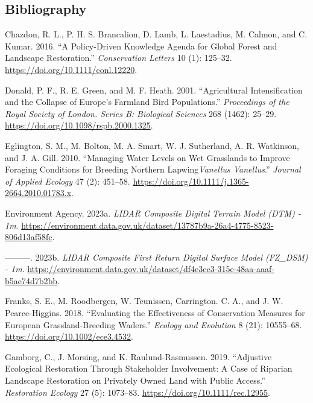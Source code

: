 \documentclass[
  12pt,
  letterpaper,
  DIV=11,
  numbers=noendperiod]{scrartcl}
\newlength{\cslhangindent}
\newenvironment{CSLReferences}[2] %
 {\begin{list}{}{%
  \setlength{\itemindent}{0pt}
  \setlength{\leftmargin}{0pt}
  \setlength{\parsep}{0pt}
  \ifodd #1
   \setlength{\leftmargin}{\cslhangindent}
   \setlength{\itemindent}{-1\cslhangindent}
  \fi
  \setlength{\itemsep}{#2\baselineskip}}}
 {\end{list}}
\begin{document}
\subsection*{Bibliography}\label{bibliography}

\label{refs}
\begin{CSLReferences}{1}{0}
Chazdon, R. L., P. H. S. Brancalion, D. Lamb, L. Laestadius, M. Calmon,
and C. Kumar. 2016. {``A Policy{-}Driven Knowledge Agenda for Global
Forest and Landscape Restoration.''} \emph{Conservation Letters} 10 (1):
125--32. \url{https://doi.org/10.1111/conl.12220}.

Donald, P. F., R. E. Green, and M. F. Heath. 2001. {``Agricultural
Intensification and the Collapse of Europe's Farmland Bird
Populations.''} \emph{Proceedings of the Royal Society of London. Series
B: Biological Sciences} 268 (1462): 25--29.
\url{https://doi.org/10.1098/rspb.2000.1325}.

Eglington, S. M., M. Bolton, M. A. Smart, W. J. Sutherland, A. R.
Watkinson, and J. A. Gill. 2010. {``Managing Water Levels on Wet
Grasslands to Improve Foraging Conditions for Breeding Northern
Lapwing{\emph{Vanellus Vanellus}}.''} \emph{Journal of Applied Ecology}
47 (2): 451--58. \url{https://doi.org/10.1111/j.1365-2664.2010.01783.x}.

Environment Agency. 2023a. \emph{LIDAR Composite Digital Terrain Model
(DTM) - 1m}.
\url{https://environment.data.gov.uk/dataset/13787b9a-26a4-4775-8523-806d13af58fc}.

---------. 2023b. \emph{LIDAR Composite First Return Digital Surface
Model (FZ\_DSM) - 1m}.
\url{https://environment.data.gov.uk/dataset/df4e3ec3-315e-48aa-aaaf-b5ae74d7b2bb}.

Franks, S. E., M. Roodbergen, W. Teunissen, Carrington. C. A., and J. W.
Pearce-Higgins. 2018. {``Evaluating the Effectiveness of Conservation
Measures for European Grassland{-}Breeding Waders.''} \emph{Ecology and
Evolution} 8 (21): 10555--68. \url{https://doi.org/10.1002/ece3.4532}.

Gamborg, C., J. Morsing, and K. Raulund-Rasmussen. 2019. {``Adjustive
Ecological Restoration Through Stakeholder Involvement: A Case of
Riparian Landscape Restoration on Privately Owned Land with Public
Access.''} \emph{Restoration Ecology} 27 (5): 1073--83.
\url{https://doi.org/10.1111/rec.12955}.


\end{CSLReferences}
\end{document}
